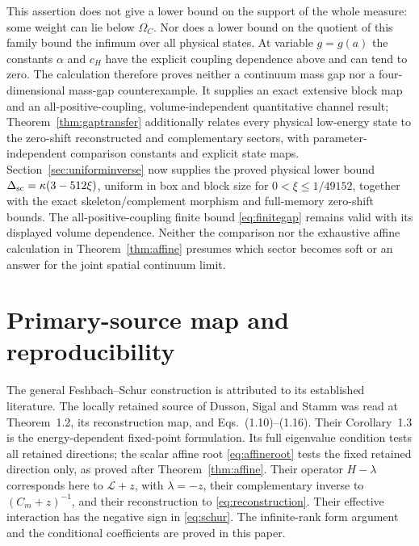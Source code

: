 \documentclass[11pt]{article}
\newcommand{\LL}{\mathscr L}
\begin{document}
This assertion does not give a lower bound on the support of the whole
measure: some weight can lie below $\Omega_C$. Nor does a lower bound
on the quotient of this family bound the infimum over all physical
states. At variable $g=g(a)$ the constants $\alpha$ and $c_H$ have the
explicit coupling dependence above and can tend to zero. The calculation
therefore proves neither a continuum mass gap nor a four-dimensional
mass-gap counterexample. It supplies an exact extensive block map and
an all-positive-coupling, volume-independent quantitative channel result;
Theorem~\ref{thm:gaptransfer} additionally relates every physical
low-energy state to the zero-shift reconstructed and complementary
sectors, with parameter-independent comparison constants and explicit
state maps. Section~\ref{sec:uniforminverse} now supplies the proved
physical lower bound $\Delta_{\rm sc}=\kappa(3-512\xi)$, uniform
in box and block size for $0<\xi\leq1/49152$, together with the
exact skeleton/complement morphism and full-memory zero-shift bounds.
The all-positive-coupling finite bound \eqref{eq:finitegap} remains
valid with its displayed volume dependence. Neither the comparison
nor the exhaustive affine calculation
in Theorem~\ref{thm:affine} presumes which sector becomes soft or an
answer for the joint spatial continuum limit.

\section{Primary-source map and reproducibility}

The general Feshbach--Schur construction is attributed to its established
literature. The locally retained source of Dusson, Sigal and Stamm was
read at Theorem~1.2, its reconstruction map, and Eqs.~(1.10)--(1.16).
Their Corollary~1.3 is the energy-dependent fixed-point formulation.
Its full eigenvalue condition tests all retained directions; the
scalar affine root \eqref{eq:affineroot} tests the fixed retained
direction only, as proved after Theorem~\ref{thm:affine}.
Their operator $H-\lambda$ corresponds here to $\LL+z$, with
$\lambda=-z$, their complementary inverse to $(C_m+z)^{-1}$, and
their reconstruction to \eqref{eq:reconstruction}. Their effective
interaction has the negative sign in \eqref{eq:schur}. The infinite-rank
form argument and the conditional coefficients are proved in this paper.
\end{document}
